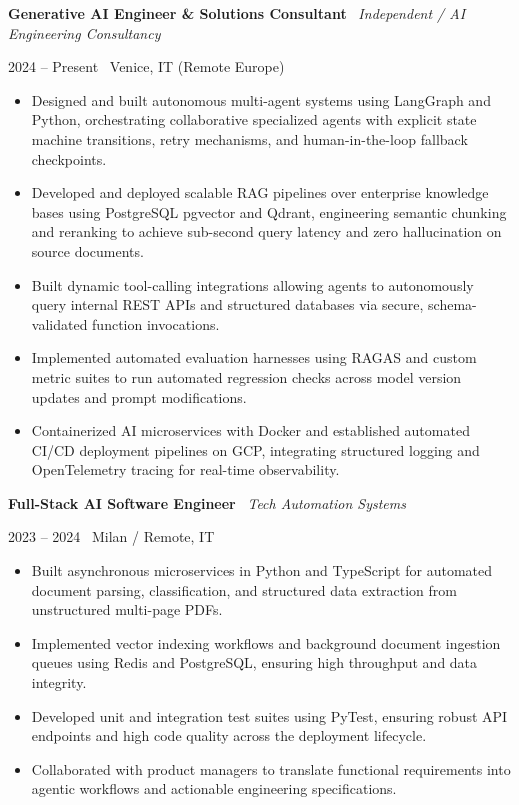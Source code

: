 \documentclass[a4paper,10pt]{article}
\newcommand{\role}[4]{%
  \vspace{2pt}\noindent
  \begin{minipage}[t]{0.70\textwidth}\raggedright\textbf{#1} \textbullet\ \textit{#3}\end{minipage}%
  \hfill
  \begin{minipage}[t]{0.28\textwidth}\raggedleft\footnotesize\color{gray}#2 \textbullet\ #4\end{minipage}%
  \vspace{1pt}%
}
\begin{document}
\role{Generative AI Engineer \& Solutions Consultant}{2024 -- Present}{Independent / AI Engineering Consultancy}{Venice, IT (Remote Europe)}
\begin{itemize}
  \item Designed and built autonomous multi-agent systems using LangGraph and Python, orchestrating collaborative specialized agents with explicit state machine transitions, retry mechanisms, and human-in-the-loop fallback checkpoints.
  \item Developed and deployed scalable RAG pipelines over enterprise knowledge bases using PostgreSQL pgvector and Qdrant, engineering semantic chunking and reranking to achieve sub-second query latency and zero hallucination on source documents.
  \item Built dynamic tool-calling integrations allowing agents to autonomously query internal REST APIs and structured databases via secure, schema-validated function invocations.
  \item Implemented automated evaluation harnesses using RAGAS and custom metric suites to run automated regression checks across model version updates and prompt modifications.
  \item Containerized AI microservices with Docker and established automated CI/CD deployment pipelines on GCP, integrating structured logging and OpenTelemetry tracing for real-time observability.
\end{itemize}

\vspace{3pt}
\role{Full-Stack AI Software Engineer}{2023 -- 2024}{Tech Automation Systems}{Milan / Remote, IT}
\begin{itemize}
  \item Built asynchronous microservices in Python and TypeScript for automated document parsing, classification, and structured data extraction from unstructured multi-page PDFs.
  \item Implemented vector indexing workflows and background document ingestion queues using Redis and PostgreSQL, ensuring high throughput and data integrity.
  \item Developed unit and integration test suites using PyTest, ensuring robust API endpoints and high code quality across the deployment lifecycle.
  \item Collaborated with product managers to translate functional requirements into agentic workflows and actionable engineering specifications.
\end{itemize}
\end{document}
